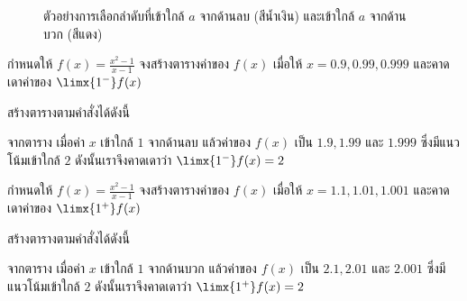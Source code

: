 \begin{frame}
\begin{figure}[h!]
\centering
{}
\caption{ตัวอย่างการเลือกลำดับที่เข้าใกล้ $a$ จากด้านลบ (สีน้ำเงิน) และเข้าใกล้ $a$ จากด้านบวก (สีแดง)}
\label{fig:limit_numerical_seq}
\end{figure}
\end{frame}


\begin{frame}[t]
\begin{ex}
กำหนดให้ $f(x) = \frac{x^2-1}{x-1}$ จงสร้างตารางค่าของ $f(x)$ เมื่อให้ $x = 0.9, 0.99, 0.999$ และคาดเดาค่าของ $\limx{1^{-}}f(x)$ 
\end{ex}
\begin{sol}
สร้างตารางตามคำสั่งได้ดังนี้
\begin{table}[h!]
\centering
{}
\end{table}
จากตาราง เมื่อค่า $x$ เข้าใกล้ $1$ จากด้านลบ แล้วค่าของ $f(x)$ เป็น $1.9, 1.99$ และ $1.999$ ซึ่งมีแนวโน้มเข้าใกล้ $2$ ดังนั้นเราจึงคาดเดาว่า $\limx{1^{-}}f(x) = 2$
\end{sol}
\end{frame}


\begin{frame}[t]
\begin{ex}
กำหนดให้ $f(x) = \frac{x^2-1}{x-1}$ จงสร้างตารางค่าของ $f(x)$ เมื่อให้ $x = 1.1, 1.01, 1.001$ และคาดเดาค่าของ $\limx{1^{+}}f(x)$ 
\end{ex}
\begin{sol}
สร้างตารางตามคำสั่งได้ดังนี้
\begin{table}[h!]
\centering
{}
\end{table}\pa
จากตาราง เมื่อค่า $x$ เข้าใกล้ $1$ จากด้านบวก แล้วค่าของ $f(x)$ เป็น $2.1, 2.01$ และ $2.001$ ซึ่งมีแนวโน้มเข้าใกล้ $2$ ดังนั้นเราจึงคาดเดาว่า $\limx{1^{+}}f(x) = 2$
\end{sol}
\end{frame}


